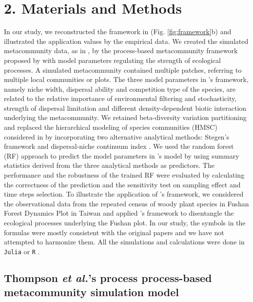 \chapter*{2. Materials and Methods}
\setcounter{chapter}{2}
	\noindent
	In our study, we reconstructed the framework in \citet{guzman2022accounting} (Fig. \ref{fig:framework}b) and illustrated the application values by the empirical data. We created the simulated metacommunity data, as in \citet{guzman2022accounting}, by the process-based metacommunity framework proposed by \citet{thompson2020process} with model parameters regulating the strength of ecological processes. A simulated metacommunity contained multiple patches, referring to multiple local communities or plots. The three model parameters in \citeauthor{thompson2020process}'s framework, namely niche width, dispersal ability and competition type of the species, are related to the relative importance of environmental filtering and stochasticity, strength of dispersal limitation and different density-dependent biotic interaction underlying the metacommunity. We retained beta-diversity variation partitioning and replaced the hierarchical modeling of species communities (HMSC) considered in \citet{guzman2022accounting} by incorporating two alternative analytical methods: Stegen's framework \citep{stegen2013quantifying} and dispersal-niche continuum index \citep{vilmi2021dispersal}. We used the random forest (RF) approach to predict the model parameters in \citeauthor{thompson2020process}'s model by using summary statistics derived from the three analytical methods as predictors. The performance and the robustness of the trained RF were evaluated by calculating the correctness of the prediction and the sensitivity test on sampling effect and time steps selection. To illustrate the application of \citeauthor{guzman2022accounting}'s framework, we considered the observational data from the repeated census of woody plant species in Fushan Forest Dynamics Plot in Taiwan and applied \citeauthor{guzman2022accounting}'s framework to disentangle the ecological processes underlying the Fushan plot. In our study, the symbols in the formulas were mostly consistent with the original papers and we have not attempted to harmonize them. All the simulations and calculations were done in \texttt{Julia} \citep{bezanson2017julia} or \texttt{R} \citep{R}.
	
	
	\section{Thompson \textit{et al.}'s process process-based metacommunity simulation model}
	\label{sec:thom}
